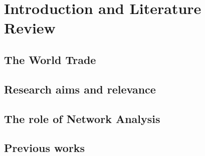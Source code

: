 \chapter{Introduction and Literature Review}

\section{The World Trade}
\section{Research aims and relevance}
\section{The role of Network Analysis}
\section{Previous works}







